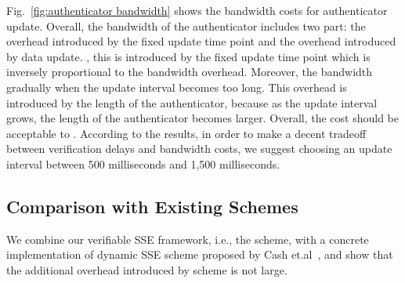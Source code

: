 Fig.~\ref{fig:authenticator bandwidth} shows the bandwidth costs for authenticator update. %
 Overall, the bandwidth of the authenticator includes two part: the overhead introduced by the fixed update time point and the overhead introduced by data update. , this is introduced by the fixed update time point which is inversely proportional to the bandwidth overhead. Moreover, the bandwidth gradually  when the update interval becomes too long. This overhead is introduced by the length of the authenticator, because as the update interval grows, the length of the authenticator becomes larger. Overall, the cost should be acceptable to  \name. According to the results, in order to make a decent tradeoff between verification delays and bandwidth costs, we suggest choosing an update interval between 500 milliseconds and 1,500 milliseconds.





\subsection{Comparison with Existing Schemes}
We combine our verifiable SSE framework, i.e., the \name scheme, with a concrete implementation of dynamic SSE scheme proposed by Cash et.al~\cite{cash2014dynamic}, and show that the additional overhead introduced by \name scheme is not large.

